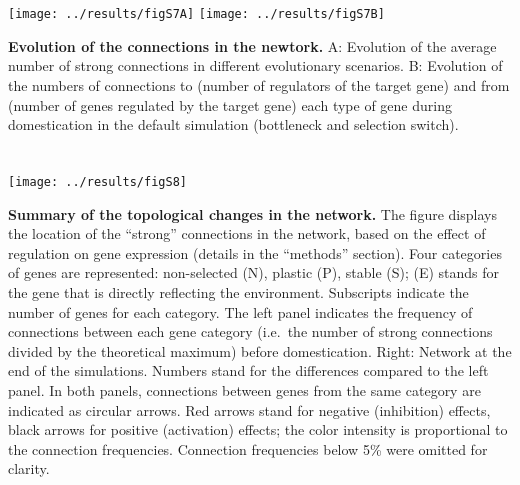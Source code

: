 \documentclass[10pt,a4paper]{article}
\begin{document}
\clearpage

\section{}

\vspace{2cm}

\begin{center}
\texttt{[image: ../results/figS7A]}
\texttt{[image: ../results/figS7B]}
\end{center}

\vspace{2cm}

\textbf{Evolution of the connections in the newtork.} A: Evolution of the average number of strong connections in different evolutionary scenarios. B: Evolution of the numbers of connections to (number of regulators of the target gene) and from (number of genes regulated by the target gene) each type of gene during domestication in the default simulation (bottleneck and selection switch). 

\clearpage

\section{}

\vspace{2cm}

\begin{center}
\texttt{[image: ../results/figS8]}
\end{center}

\vspace{2cm}

\textbf{Summary of the topological changes in the network.} The figure displays the location of the “strong” connections in the network, based on the effect of regulation on gene expression (details in the “methods” section). Four categories of genes are represented: non-selected (N), plastic (P), stable (S); (E) stands for the gene that is directly reflecting the environment. Subscripts indicate the number of genes for each category.  The left panel indicates the frequency of connections between each gene category (i.e.\ the number of strong connections divided by the theoretical maximum) before domestication. Right: Network at the end of the simulations. Numbers stand for the differences compared to the left panel. In both panels, connections between genes from the same category are indicated as circular arrows. Red arrows stand for negative (inhibition) effects, black arrows for positive (activation) effects; the color intensity is proportional to the connection frequencies. Connection frequencies below 5\% were omitted for clarity.
\end{document}
